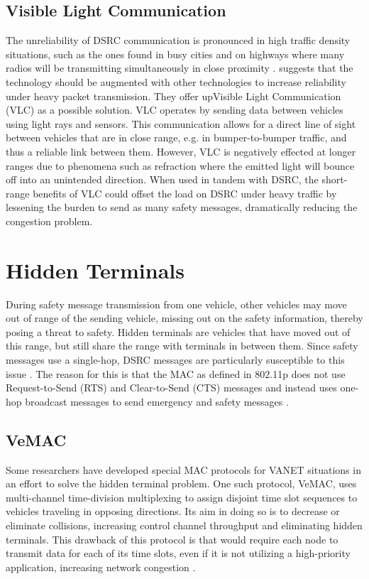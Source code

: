 \documentclass[twoside,conference]{IEEEtran}
\begin{document}
	\subsection{Visible Light Communication}\label{sec:visiblelightcommunication}
		The unreliability of DSRC communication is pronounced in high traffic density situations, such as the ones found in busy cities and on highways where many radios will be transmitting simultaneously in close proximity \cite{Cailean2014}. \cite{Cailean2014} suggests that the technology should be augmented with other technologies to increase reliability under heavy packet transmission. They offer upVisible Light Communication (VLC) as a possible solution. VLC operates by sending data between vehicles using light rays and sensors. This communication allows for a direct line of sight between vehicles that are in close range, e.g. in bumper-to-bumper traffic, and thus a reliable link between them. However, VLC is negatively effected at longer ranges due to phenomena such as refraction where the emitted light will bounce off into an unintended direction. When used in tandem with DSRC, the short-range benefits of VLC could offset the load on DSRC under heavy traffic by lessening the burden to send as many safety messages, dramatically reducing the congestion problem.

\section{Hidden Terminals}\label{sec:hiddenterminal}
		During safety message transmission from one vehicle, other vehicles may move out of range of the sending vehicle, missing out on the safety information, thereby posing a threat to safety. Hidden terminals are vehicles that have moved out of this range, but still share the range with terminals in between them. Since safety messages use a single-hop, DSRC messages are particularly susceptible to this issue \cite{Ma2009}.  The reason for this is that the MAC as defined in 802.11p does not use Request-to-Send (RTS) and Clear-to-Send (CTS) messages and instead uses one-hop broadcast messages to send emergency and safety messages \cite[p. 969]{Rahman2014}. 
		
		\subsection{VeMAC}\label{sec:vemac}
			Some researchers have developed special MAC protocols for VANET situations in an effort to solve the hidden terminal problem. One such protocol, VeMAC, uses multi-channel time-division multiplexing to assign disjoint time slot sequences to vehicles traveling in opposing directions. Its aim in doing so is to decrease or eliminate collisions, increasing control channel throughput and eliminating hidden terminals\cite{Omar2013}. This drawback of this protocol is that would require each node to transmit data for each of its time slots, even if it is not utilizing a high-priority application, increasing network congestion \cite{Kolte2014}. 
		
\end{document}
